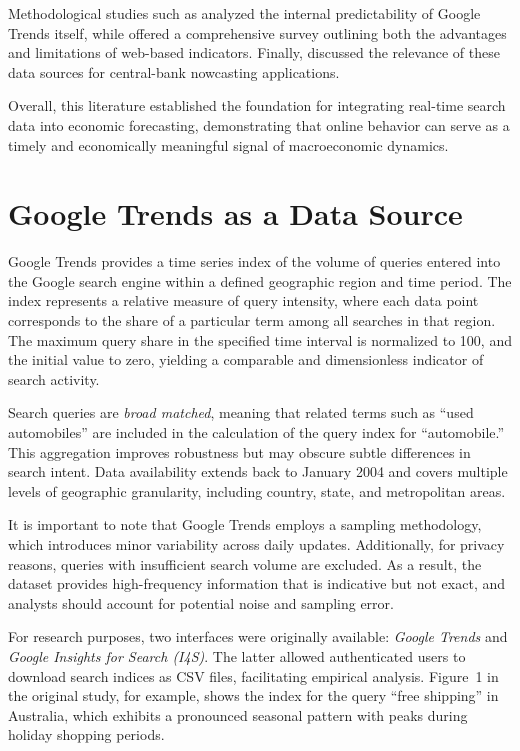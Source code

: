 \documentclass{article}
\begin{document}
Methodological studies such as \textcite{Shimshoni2009} analyzed the internal predictability of Google Trends itself, while \textcite{Goel2010} offered a comprehensive survey outlining both the advantages and limitations of web-based indicators. 
Finally, \textcite{McLaren2011} discussed the relevance of these data sources for central-bank nowcasting applications.

Overall, this literature established the foundation for integrating real-time search data into economic forecasting, demonstrating that online behavior can serve as a timely and economically meaningful signal of macroeconomic dynamics.



\section{Google Trends as a Data Source}

Google Trends provides a time series index of the volume of queries entered into the Google search engine within a defined geographic region and time period. 
The index represents a relative measure of query intensity, where each data point corresponds to the share of a particular term among all searches in that region. 
The maximum query share in the specified time interval is normalized to 100, and the initial value to zero, yielding a comparable and dimensionless indicator of search activity.

Search queries are \textit{broad matched}, meaning that related terms such as ``used automobiles'' are included in the calculation of the query index for ``automobile.'' 
This aggregation improves robustness but may obscure subtle differences in search intent. 
Data availability extends back to January 2004 and covers multiple levels of geographic granularity, including country, state, and metropolitan areas.

It is important to note that Google Trends employs a sampling methodology, which introduces minor variability across daily updates. 
Additionally, for privacy reasons, queries with insufficient search volume are excluded. 
As a result, the dataset provides high-frequency information that is indicative but not exact, and analysts should account for potential noise and sampling error.

For research purposes, two interfaces were originally available: \textit{Google Trends} and \textit{Google Insights for Search (I4S)}. 
The latter allowed authenticated users to download search indices as CSV files, facilitating empirical analysis. 
Figure~1 in the original study, for example, shows the index for the query ``free shipping'' in Australia, which exhibits a pronounced seasonal pattern with peaks during holiday shopping periods.
\end{document}
